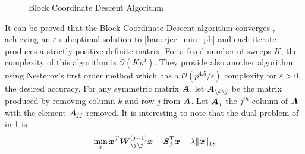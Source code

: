 \begin{figure}
\begin{center}
   \caption{Block Coordinate Descent Algorithm}
   \label{fig:banerjee_block_algo}

\end{center}
\end{figure}
It can be proved that the Block Coordinate Descent algorithm converges \citep{banerjee}, achieving an $\varepsilon$-suboptimal solution to \cref{banerjee_min_pb} and each iterate produces a strictly positive definite matrix. For a fixed number of sweeps $K$, the complexity of this algorithm is $\mathcal O (Kp^4)$. They provide also another algorithm using Nesterov's first order method which has a $\mathcal O(p^{4.5}/\epsilon)$ complexity for $\varepsilon > 0$, the desired accuracy. For any symmetric matrix $\boldsymbol A$, let $\boldsymbol A_{\setminus k \setminus j}$ be the matrix produced by removing column $k$ and row $j$ from $\boldsymbol A$. Let $\boldsymbol A_j$ the $j^{th}$ column of $\boldsymbol A$ with the element $\boldsymbol A_{jj}$ removed. It is interesting to note that the dual problem of  in \cref{fig:banerjee_block_algo} is 
\begin{equation}
  \min_{\boldsymbol x} \boldsymbol x^T\boldsymbol W_{\setminus j \setminus j}^{(j-1)}\boldsymbol x - \boldsymbol S_j^T\boldsymbol x + \lambda\|\boldsymbol x\|_1,
\end{equation}
